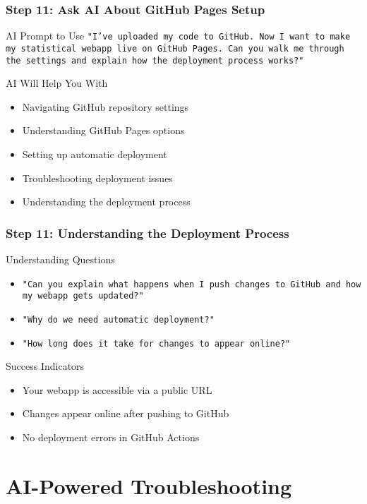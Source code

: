 \documentclass[aspectratio=169]{beamer}
\begin{document}
\begin{frame}
\frametitle{Step 11: Ask AI About GitHub Pages Setup}
\begin{alertblock}{AI Prompt to Use}
\texttt{"I've uploaded my code to GitHub. Now I want to make my statistical webapp live on GitHub Pages. Can you walk me through the settings and explain how the deployment process works?"}
\end{alertblock}

\begin{exampleblock}{AI Will Help You With}
\begin{itemize}
\item Navigating GitHub repository settings
\item Understanding GitHub Pages options
\item Setting up automatic deployment
\item Troubleshooting deployment issues
\item Understanding the deployment process
\end{itemize}
\end{exampleblock}
\end{frame}

\begin{frame}
\frametitle{Step 11: Understanding the Deployment Process}
\begin{alertblock}{Understanding Questions}
\begin{itemize}
\item \texttt{"Can you explain what happens when I push changes to GitHub and how my webapp gets updated?"}
\item \texttt{"Why do we need automatic deployment?"}
\item \texttt{"How long does it take for changes to appear online?"}
\end{itemize}
\end{alertblock}

\begin{exampleblock}{Success Indicators}
\begin{itemize}
\item Your webapp is accessible via a public URL
\item Changes appear online after pushing to GitHub
\item No deployment errors in GitHub Actions
\end{itemize}
\end{exampleblock}
\end{frame}

\section{AI-Powered Troubleshooting}
\end{document}
